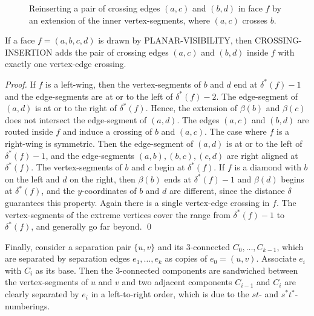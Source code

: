 \documentclass[runningheads]{llncs}
\begin{document}
\begin{figure}
  \centering
  \quad\quad
  \caption{Reinserting a pair of crossing edges $(a,c)$ and $(b,d)$ in face $f$ by an extension
  of the inner vertex-segments, where $(a,c)$ crosses  $b$.
  \label{fig:crossinginsertion}}
\end{figure}





\begin{lemma} \label{proofCrossingInsertion}
If a face $f = (a,b,c,d)$ is drawn by PLANAR-VISIBILITY, then
CROSSING-INSERTION adds the pair of crossing edges $(a,c)$ and
$(b,d)$ inside $f$ with exactly one vertex-edge crossing.
\end{lemma}

\begin{proof}
If $f$ is  a left-wing, then the vertex-segments of $b$ and $d$ end
at $\delta^*(f)-1$ and the edge-segments are at or to the left of
$\delta^*(f)-2$. The edge-segment of $(a,d)$ is at or to the right
of $\delta^*(f)$. Hence, the extension of $\beta(b)$ and $\beta(c)$
does not intersect the edge-segment of $(a,d)$. The edges $(a,c)$
and $(b,d)$ are routed inside $f$ and induce a crossing of $b$ and
$(a,c)$. The case where $f$ is a right-wing is symmetric. Then the
edge-segment of $(a,d)$ is at or to the left of $\delta^*(f)-1$, and
the edge-segments $(a,b), (b,c), (c,d)$ are right aligned at
$\delta^*(f)$. The vertex-segments of $b$ and $c$ begin at
$\delta^*(f)$. If $f$ is a diamond with $b$ on the left and $d$ on
the right, then $\beta(b)$ ends at $\delta^*(f)-1$ and $\beta(d)$
begins at $\delta^*(f)$, and the $y$-coordinates of $b$ and $d$ are
different, since the distance $\delta$ guarantees this property.
Again there is
 a single
vertex-edge crossing in $f$. The vertex-segments of the extreme
vertices cover the range from $\delta^*(f)-1$  to $\delta^*(f)$, and
generally go far beyond. \qed
\end{proof}




Finally, consider a separation pair $\{u, v \}$ and its 3-connected
$C_0, \ldots, C_{k-1}$, which are separated by separation edges
$e_1, \ldots, e_k$ as copies of $e_0 = (u,v)$. Associate $e_i$ with
$C_i$ as its base. Then the 3-connected components are sandwiched
between the vertex-segments of $u$ and $v$ and two adjacent
components $C_{i-1}$ and $C_i$ are clearly separated by $e_i$ in a
left-to-right order, which is due to the $st$- and
$s^*t^*$-numberings.
\end{document}
